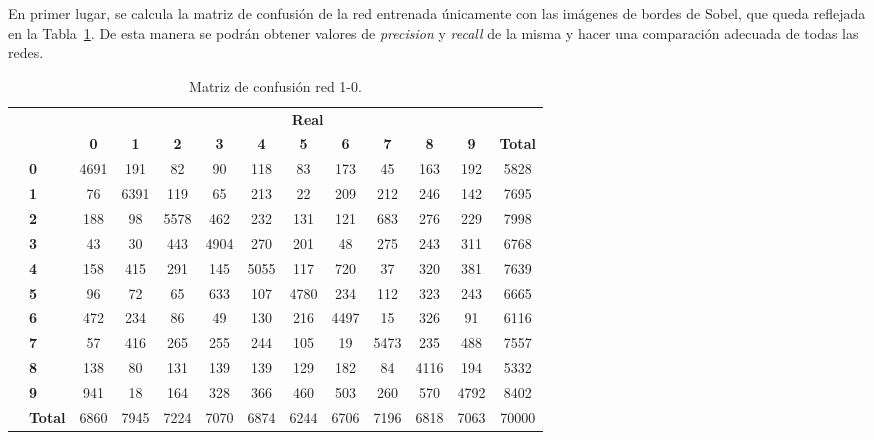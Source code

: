 En primer lugar, se calcula la matriz de confusión de la red entrenada únicamente con las imágenes de bordes de Sobel, que queda reflejada en la Tabla~\ref{tab.matriz1-0}. De esta manera se podrán obtener valores de \textit{precision} y \textit{recall} de la misma y hacer una comparación adecuada de todas las redes.\\
\begin{table}[H]
	\centering
	\begin{tabular}{|c|l|c|c|c|c|c|c|c|c|c|c|c|}
		\cline{3-13} 
		\multicolumn{2}{c|}{} & \multicolumn{11}{c|}{\textbf{Real}} \\ \cline{3-13} 
		\multicolumn{2}{c|}{} & \textbf{0} & \textbf{1} & \textbf{2} &  \textbf{3} & \textbf{4} & \textbf{5} & \textbf{6} & \textbf{7} & \textbf{8} & \textbf{9} & \textbf{Total}\\ \hline
		\multirow{10}{0.5cm}{\rotatebox{90}{\textbf{Predicción}}}& \textbf{0} &  \cellcolor{lightgray}4691 & 191 & 82 & 90 & 118 & 83 & 173 & 45 & 163 & 192 & 5828\\ \cline{2-13}
		& \textbf{1} & 76 & \cellcolor{lightgray}6391 & 119 & 65 & 213 & 22 & 209 & 212 & 246 & 142 & 7695\\ \cline{2-13}
		& \textbf{2} & 188 & 98 & \cellcolor{lightgray}5578 & 462 & 232 & 131 & 121 & 683 & 276 & 229 & 7998\\ \cline{2-13}
		& \textbf{3} & 43 & 30 & 443 & \cellcolor{lightgray}4904 & 270 & 201 & 48 & 275 & 243 & 311 & 6768\\ \cline{2-13}
		& \textbf{4} & 158 & 415 & 291 & 145 & \cellcolor{lightgray}5055 & 117 & 720 & 37 & 320 & 381 & 7639\\ \cline{2-13}
		& \textbf{5} & 96 & 72 & 65 & 633 & 107 & \cellcolor{lightgray}4780 & 234 & 112 & 323 & 243 & 6665\\ \cline{2-13}
		& \textbf{6} & 472 & 234 & 86 & 49 & 130 & 216 & \cellcolor{lightgray}4497 & 15 & 326 & 91 & 6116\\ \cline{2-13}
		& \textbf{7} & 57 & 416 & 265 & 255 & 244 & 105 & 19 & \cellcolor{lightgray}5473 & 235 & 488 & 7557\\ \cline{2-13}
		& \textbf{8} & 138 & 80 & 131 & 139 & 139 & 129 & 182 & 84 & \cellcolor{lightgray}4116 & 194 & 5332\\ \cline{2-13}
		& \textbf{9} & 941 & 18 & 164 & 328 & 366 & 460 & 503 & 260 & 570 & \cellcolor{lightgray}4792 & 8402\\ \cline{2-13} 
		& \textbf{Total} & 6860 & 7945 & 7224 & 7070 & 6874 & 6244 & 6706 & 7196 & 6818 & 7063 & 70000\\ \hline
	\end{tabular}
	\caption{Matriz de confusión red 1-0.}
	\label{tab.matriz1-0}
\end{table}

